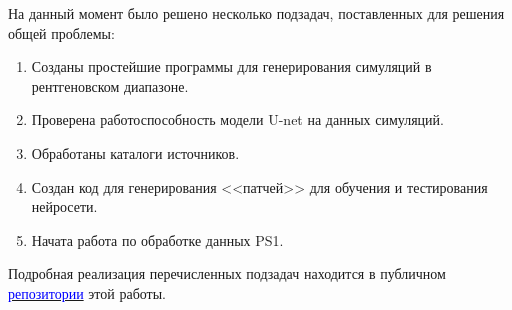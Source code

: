 \Conclusion %

На данный момент было решено несколько подзадач, поставленных для решения общей проблемы:

\begin{enumerate}
    \item Созданы простейшие программы для генерирования симуляций в рентгеновском диапазоне.
    \item Проверена работоспособность модели U-net на данных симуляций.
    \item Обработаны каталоги источников.
    \item Создан код для генерирования <<патчей>> для обучения и тестирования нейросети.
    \item Начата работа по обработке данных PS1.
\end{enumerate} 

Подробная реализация перечисленных подзадач находится в публичном  
\href{https://github.com/rt2122/data-segmentation}{\textcolor{blue}{репозитории}} этой работы. 
